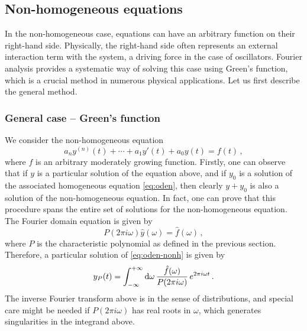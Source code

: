 \subsection{Non-homogeneous equations}
In the non-homogeneous case, equations can have an arbitrary function on their right-hand
side. Physically, the right-hand side often represents an external interaction term with
the system, \eg a driving force in the case of oscillators. Fourier analysis provides a
systematic way of solving this case using Green's function, which is a crucial method in
numerous physical applications. Let us first describe the general method.
\subsubsection{General case -- Green's function}
We consider the non-homogeneous equation
\begin{equation}
  a_ny^{(n)}(t)+\cdots+a_1y'(t)+a_0y(t)=f(t)\,,\label{eq:oden-nonh}
\end{equation}
where $f$ is an arbitrary moderately growing function. Firstly, one can observe that if
$y$ is a particular solution of the equation above, and if $y_0$ is a solution of the
associated homogeneous equation \cref{eq:oden}, then clearly $y+y_0$ is also a solution of
the non-homogeneous equation. In fact, one can prove that this procedure spans the entire
set of solutions for the non-homogeneous equation. The Fourier domain equation is given by
\begin{equation}
  P(2\pi i\omega)\hat{y}(\omega)=\hat{f}(\omega)\,,
\end{equation}
where $P$ is the characteristic polynomial as defined in the previous section. Therefore,
a particular solution of \cref{eq:oden-nonh} is given by
\begin{equation}
  y_P(t)=\int_{-\infty}^{+\infty}\mathrm{d}{\omega}\,\frac{\hat{f}(\omega)}{P(2\pi i\omega)}\,e^{2\pi i \omega t}\,.
  \label{eq:oden-part}
\end{equation}
The inverse Fourier transform above is in the sense of distributions, and special care
might be needed if $P(2\pi i\omega)$ has real roots in $\omega$, which generates
singularities in the integrand above.

